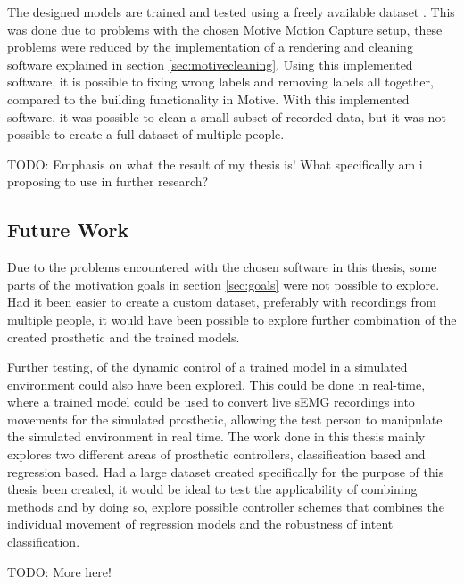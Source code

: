 \documentclass[../main.tex]{subfiles}
\begin{document}
The designed models are trained and tested using a freely available dataset \cite{kinmusdataset}.
This was done due to problems with the chosen Motive Motion Capture setup, these problems were reduced by the implementation of a rendering and cleaning software explained in section \ref{sec:motivecleaning}.
Using this implemented software, it is possible to fixing wrong labels and removing labels all together, compared to the building functionality in Motive.
With this implemented software, it was possible to clean a small subset of recorded data, but it was not possible to create a full dataset of multiple people.

TODO: Emphasis on what the result of my thesis is! What specifically am i proposing to use in further research?


\newpage
\subsection{Future Work}

Due to the problems encountered with the chosen software in this thesis, some parts of the motivation goals in section \ref{sec:goals} were not possible to explore.
Had it been easier to create a custom dataset, preferably with recordings from multiple people, it would have been possible to explore further combination of the created prosthetic and the trained models.

Further testing, of the dynamic control of a trained model in a simulated environment could also have been explored.
This could be done in real-time, where a trained model could be used to convert live sEMG recordings into movements for the simulated prosthetic, allowing the test person to manipulate the simulated environment in real time.
The work done in this thesis mainly explores two different areas of prosthetic controllers, classification based and regression based.
Had a large dataset created specifically for the purpose of this thesis been created, it would be ideal to test the applicability of combining methods and by doing so, explore possible controller schemes that combines the individual movement of regression models and the robustness of intent classification.  


TODO: More here!
\end{document}
